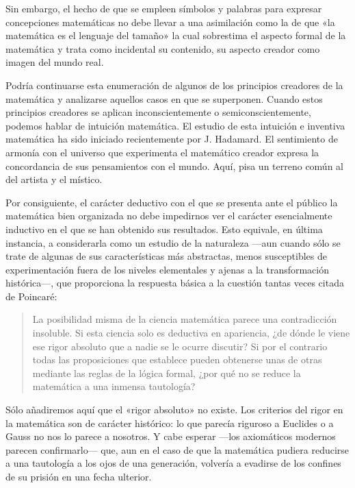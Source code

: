 \documentclass[a4paper, 12pt]{article}
\begin{document}
{{Sin embargo, el hecho de que se empleen símbolos y palabras para expresar
concepciones matemáticas no debe llevar a una asimilación como la de que «la
matemática es el lenguaje del tamaño» la cual sobrestima el aspecto formal de la
matemática y trata como incidental su contenido, su aspecto creador como imagen
del mundo real.

Podría continuarse esta enumeración de algunos de los principios creadores de la
matemática y analizarse aquellos casos en que se superponen. Cuando estos
principios creadores se aplican inconscientemente o semiconscientemente, podemos
hablar de intuición matemática. El estudio de esta intuición e inventiva
matemática ha sido iniciado recientemente por J. Hadamard. El sentimiento de
armonía con el universo que experimenta el matemático creador expresa la
concordancia de sus pensamientos con el mundo. Aquí, pisa un terreno común al
del artista y el místico.

Por consiguiente, el carácter deductivo con el que se presenta ante el público
la matemática bien organizada no debe impedirnos ver el carácter esencialmente
inductivo en el que se han obtenido sus resultados. Esto equivale, en última
instancia, a considerarla como un estudio de la naturaleza ---aun cuando sólo se
trate de algunas de sus características más abstractas, menos susceptibles de
experimentación fuera de los niveles elementales y ajenas a la transformación
histórica---, que proporciona la respuesta básica a la cuestión tantas veces
citada de Poincaré:

\begin{quote}\small La posibilidad misma de la ciencia matemática parece una
contradicción insoluble. Si esta ciencia solo es deductiva en apariencia, ¿de
dónde le viene ese rigor absoluto que a nadie se le ocurre discutir? Si por el
contrario todas las proposiciones que establece pueden obtenerse unas de otras
mediante las reglas de la lógica formal, ¿por qué no se reduce la matemática a
una inmensa tautología? \end{quote}

Sólo añadiremos aquí que el «rigor absoluto»  no existe. Los criterios del rigor
en la matemática son de carácter histórico: lo que parecía riguroso a Euclides o
a Gauss no nos lo parece a nosotros. Y cabe esperar ---los axiomáticos modernos
parecen confirmarlo--- que, aun en el caso de que la matemática pudiera
reducirse a una tautología a los ojos de una generación, volvería a evadirse de
los confines de su prisión en una fecha ulterior.

}}
\end{document}
